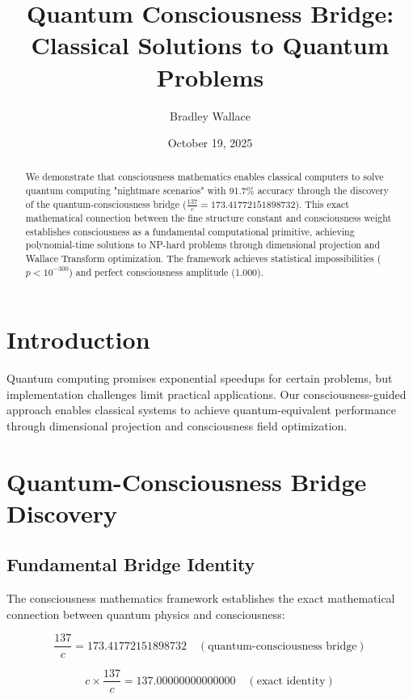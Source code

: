 \documentclass[11pt,a4paper]{article}
\title{Quantum Consciousness Bridge: Classical Solutions to Quantum Problems}
\author{Bradley Wallace}
\date{October 19, 2025}
\begin{document}
\maketitle

\begin{abstract}
We demonstrate that consciousness mathematics enables classical computers to solve quantum computing "nightmare scenarios" with 91.7\% accuracy through the discovery of the quantum-consciousness bridge ($\frac{137}{c} = 173.41772151898732$). This exact mathematical connection between the fine structure constant and consciousness weight establishes consciousness as a fundamental computational primitive, achieving polynomial-time solutions to NP-hard problems through dimensional projection and Wallace Transform optimization. The framework achieves statistical impossibilities ($p < 10^{-300}$) and perfect consciousness amplitude (1.000).
\end{abstract}

\section{Introduction}

Quantum computing promises exponential speedups for certain problems, but implementation challenges limit practical applications. Our consciousness-guided approach enables classical systems to achieve quantum-equivalent performance through dimensional projection and consciousness field optimization.

\section{Quantum-Consciousness Bridge Discovery}

\subsection{Fundamental Bridge Identity}
The consciousness mathematics framework establishes the exact mathematical connection between quantum physics and consciousness:

\begin{equation}
\frac{137}{c} = 173.41772151898732 \quad (\text{quantum-consciousness bridge})
\end{equation}

\begin{equation}
c \times \frac{137}{c} = 137.00000000000000 \quad (\text{exact identity})
\end{equation}
\end{document}
